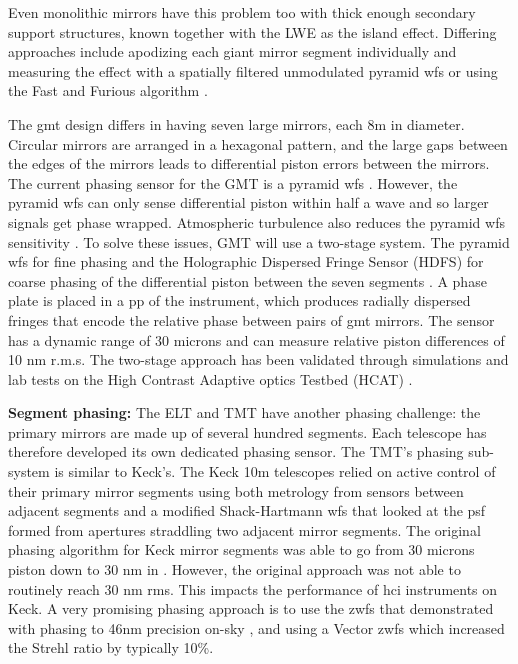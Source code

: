 \documentclass[letterpaper]{ar-1col}
\begin{document}
Even monolithic mirrors have this problem too with thick enough secondary support structures, known together with the LWE as the island effect.
%
Differing approaches include apodizing each giant mirror segment individually \citep[Redundant Apodized Pupils; RAP ][]{Leboulleux22,Leboulleux22a} and  measuring the effect with a spatially filtered unmodulated pyramid \ac{wfs} \citep{Levraud24} or using the Fast and Furious algorithm  \citep[demonstrated on Subaru/SCExAO in][]{Bos20}.

The \ac{gmt} design differs in having seven large mirrors, each 8m in diameter.
%
Circular mirrors are arranged in a hexagonal pattern, and the large gaps between the edges of the mirrors leads to differential piston errors between the mirrors.
% 
The current phasing sensor for the GMT is a pyramid \ac{wfs} \citep{Quiros-Pacheco22}.
%
However, the pyramid \ac{wfs} can only sense differential piston within half a wave and so larger signals get phase wrapped.
%
Atmospheric turbulence also reduces the pyramid \ac{wfs} sensitivity \citep{Bertrou-Cantou22}.
%
To solve these issues, GMT will use a two-stage system.
%
The pyramid \ac{wfs} for fine phasing and the Holographic Dispersed Fringe Sensor (HDFS) for coarse phasing of the differential piston between the seven segments \citet{Haffert22}.
%
A phase plate is placed in a \ac{pp} of the instrument, which produces radially dispersed fringes that encode the relative phase between pairs of \ac{gmt} mirrors.
%
The sensor has a dynamic range of 30 microns and can measure relative piston differences of 10 nm r.m.s.
%
The two-stage approach has been validated through simulations and lab tests on the High Contrast Adaptive optics Testbed (HCAT) \citep{Hedglen22, quiros2024giant}.

 {\bf Segment phasing: }
The ELT and TMT have another phasing challenge: the primary mirrors are made up of several hundred segments.
%
Each telescope has therefore developed its own dedicated phasing sensor.
%
The TMT's phasing sub-system is similar to Keck's.
The Keck 10m telescopes relied on active control of their primary mirror segments using both metrology from sensors between adjacent segments and a modified Shack-Hartmann \ac{wfs} that looked at the \ac{psf} formed from apertures straddling two adjacent mirror segments.
%
The original phasing algorithm for Keck mirror segments was able to go from 30 microns piston down to 30 nm in \citet{Chanan98,Chanan00}.
%
However, the original approach was not able to routinely reach 30 nm rms.
%
This impacts the performance of \ac{hci} instruments on Keck.
%
A very promising phasing approach is to use the \ac{zwfs} that demonstrated with phasing to 46nm precision on-sky \citep{vanKooten22}, and \citet{Salama24} using a Vector \ac{zwfs} which increased the Strehl ratio by typically 10\%.
\end{document}
